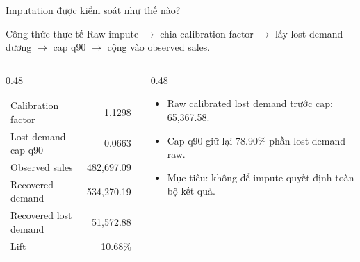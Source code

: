 \documentclass[aspectratio=169,10pt]{beamer}
\begin{document}
\begin{frame}{Imputation được kiểm soát như thế nào?}
    \begin{block}{Công thức thực tế}
    Raw impute $\rightarrow$ chia calibration factor $\rightarrow$ lấy lost demand dương $\rightarrow$ cap q90 $\rightarrow$ cộng vào observed sales.
    \end{block}
    \begin{columns}[T]
        \begin{column}{0.48\linewidth}
            \begin{tabular}{lr}
                \toprule
                Calibration factor & 1.1298 \\
                Lost demand cap q90 & 0.0663 \\
                Observed sales & 482,697.09 \\
                Recovered demand & 534,270.19 \\
                Recovered lost demand & 51,572.88 \\
                Lift & 10.68\% \\
                \bottomrule
            \end{tabular}
        \end{column}
        \begin{column}{0.48\linewidth}
            \begin{itemize}
                \item Raw calibrated lost demand trước cap: 65,367.58.
                \item Cap q90 giữ lại 78.90\% phần lost demand raw.
                \item Mục tiêu: không để impute quyết định toàn bộ kết quả.
            \end{itemize}
        \end{column}
    \end{columns}
\end{frame}
\end{document}
